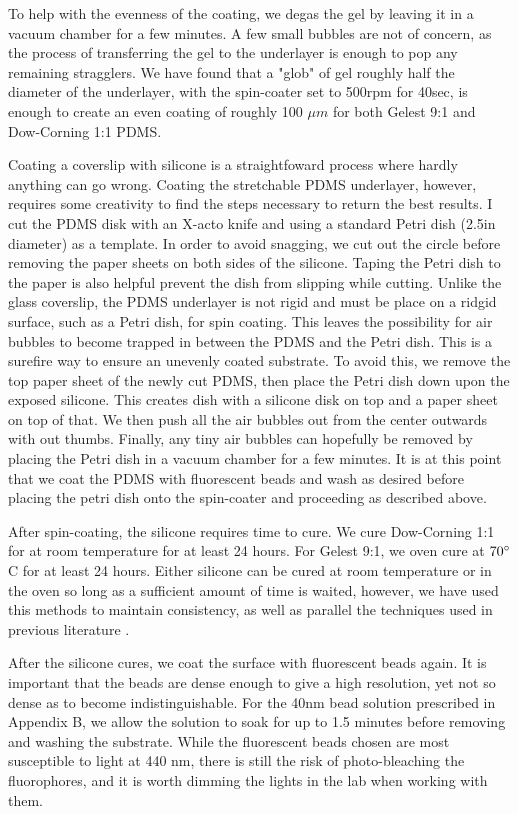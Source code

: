 To help with the evenness of the coating, we degas the gel by leaving it in a vacuum chamber for a few minutes. A few small bubbles are not of concern, as the process of transferring the gel to the underlayer is enough to pop any remaining stragglers. We have found that a "glob" of gel roughly half the diameter of the underlayer, with the spin-coater set to 500rpm for 40sec, is enough to create an even coating of roughly 100 $\mu m$ for both Gelest 9:1 and Dow-Corning 1:1 PDMS.

Coating a coverslip with silicone is a straightfoward process where hardly anything can go wrong. Coating the stretchable PDMS underlayer, however, requires some creativity to find the steps necessary to return the best results. I cut the PDMS disk with an X-acto knife and using a standard Petri dish (2.5in diameter) as a template. In order to avoid snagging, we cut out the circle before removing the paper sheets on both sides of the silicone. Taping the Petri dish to the paper is also helpful prevent the dish from slipping while cutting. Unlike the glass coverslip, the PDMS underlayer is not rigid and must be place on a ridgid surface, such as a Petri dish, for spin coating. This leaves the possibility for air bubbles to become trapped in between the PDMS and the Petri dish. This is a surefire way to ensure an unevenly coated substrate. To avoid this, we remove the top paper sheet of the newly cut PDMS, then place the Petri dish down upon the exposed silicone. This creates dish with a silicone disk on top and a paper sheet on top of that. We then push all the air bubbles out from the center outwards with out thumbs. Finally, any tiny air bubbles can hopefully be removed by placing the Petri dish in a vacuum chamber for a few minutes. It is at this point that we coat the PDMS with fluorescent beads and wash as desired before placing the petri dish onto the spin-coater and proceeding as described above.

After spin-coating, the silicone requires time to cure. We cure Dow-Corning 1:1 for at room temperature for at least 24 hours. For Gelest 9:1, we oven cure at $70 \degree$ C for at least 24 hours. Either silicone can be cured at room temperature or in the oven so long as a sufficient amount of time is waited, however, we have used this methods to maintain consistency, as well as parallel the techniques used in previous literature \cite{xu2017direct}.

After the silicone cures, we coat the surface with fluorescent beads again. It is important that the beads are dense enough to give a high resolution, yet not so dense as to become indistinguishable. For the 40nm bead solution prescribed in Appendix B, we allow the solution to soak for up to 1.5 minutes before removing and washing the substrate. While the fluorescent beads chosen are most susceptible to light at 440 nm, there is still the risk of photo-bleaching the fluorophores, and it is worth dimming the lights in the lab when working with them. 

